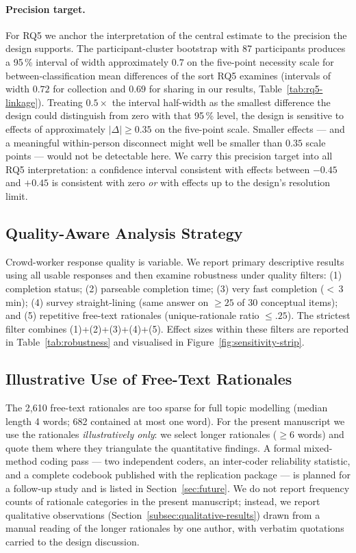 \documentclass[11pt,a4paper]{article}
\begin{document}
\paragraph{Precision target.} For RQ5 we anchor the interpretation of
the central estimate to the precision the design supports. The
participant-cluster bootstrap with 87 participants produces a 95\,\%
interval of width approximately $0.7$ on the five-point necessity
scale for between-classification mean differences of the sort RQ5
examines (intervals of width $0.72$ for collection and $0.69$ for
sharing in our results, Table~\ref{tab:rq5-linkage}). Treating $0.5\times$
the interval half-width as the smallest difference the design could
distinguish from zero with that 95\,\% level, the design is sensitive
to effects of approximately $|\Delta|\geq 0.35$ on the five-point
scale. Smaller effects --- and a meaningful within-person disconnect
might well be smaller than $0.35$ scale points --- would not be
detectable here. We carry this precision target into all RQ5
interpretation: a confidence interval consistent with effects between
$-0.45$ and $+0.45$ is consistent with zero \emph{or} with effects up
to the design's resolution limit.

\subsection{Quality-Aware Analysis Strategy}
\label{subsec:quality-aware-evaluation}

Crowd-worker response quality is variable. We report primary descriptive
results using all usable responses and then examine robustness under
quality filters: (1) completion status; (2) parseable completion time;
(3) very fast completion ($<$\,3\,min); (4) survey straight-lining
(same answer on $\geq 25$ of 30 conceptual items); and (5) repetitive
free-text rationales (unique-rationale ratio $\leq .25$). The strictest
filter combines (1)+(2)+(3)+(4)+(5). Effect sizes within these filters
are reported in Table~\ref{tab:robustness} and visualised in
Figure~\ref{fig:sensitivity-strip}.

\subsection{Illustrative Use of Free-Text Rationales}
\label{subsec:qualitative}

The 2{,}610 free-text rationales are too sparse for full topic modelling
(median length 4 words; 682 contained at most one word). For the present
manuscript we use the rationales \emph{illustratively only}: we select
longer rationales ($\geq 6$ words) and quote them where they triangulate
the quantitative findings. A formal mixed-method coding pass --- two
independent coders, an inter-coder reliability statistic, and a complete
codebook published with the replication package --- is planned for a
follow-up study and is listed in Section~\ref{sec:future}. We do not
report frequency counts of rationale categories in the present
manuscript; instead, we report qualitative observations
(Section~\ref{subsec:qualitative-results}) drawn from a manual reading
of the longer rationales by one author, with verbatim quotations carried
to the design discussion.
\end{document}
